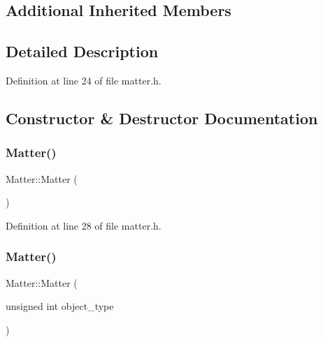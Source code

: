 \subsection*{Additional Inherited Members}


\subsection{Detailed Description}


Definition at line 24 of file matter.\+h.



\subsection{Constructor \& Destructor Documentation}
\mbox{\label{class_matter_ac2dc2f5eeef03d3bdf41a68334ae49b4}} 
\subsubsection{\texorpdfstring{Matter()}{Matter()}\hspace{0.1cm}{\footnotesize\ttfamily [1/4]}}
{\footnotesize\ttfamily Matter\+::\+Matter (\begin{DoxyParamCaption}{ }\end{DoxyParamCaption})\hspace{0.3cm}{\ttfamily [inline]}}



Definition at line 28 of file matter.\+h.

\mbox{\label{class_matter_a7e2328c2a17dcc7b57af59d1d5c9ea96}} 
\subsubsection{\texorpdfstring{Matter()}{Matter()}\hspace{0.1cm}{\footnotesize\ttfamily [2/4]}}
{\footnotesize\ttfamily Matter\+::\+Matter (\begin{DoxyParamCaption}\item[{unsigned int}]{object\+\_\+type }\end{DoxyParamCaption})\hspace{0.3cm}{\ttfamily [inline]}}



